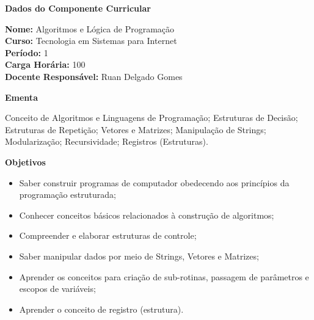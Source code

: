 
\begin{snugshade}\begin{center}\textbf{
    Dados do Componente Curricular
}\end{center}\end{snugshade}

\noindent \textbf{Nome:}                Algoritmos e L\'ogica de Programa\c{c}\~ao
\\        \textbf{Curso:}               Tecnologia em Sistemas para Internet
\\        \textbf{Período:}             \unit{1}{\degree}
\\        \textbf{Carga Horária:}       \unit{100}{\hour}
\\        \textbf{Docente Responsável:} Ruan Delgado Gomes


\begin{snugshade}\begin{center}\textbf{
    Ementa
\vphantom{q}}\end{center}\end{snugshade}

\noindent
Conceito de Algoritmos e Linguagens de Programação; Estruturas de Decisão; Estruturas de Repetição; Vetores e Matrizes; Manipulação de Strings; Modularização; Recursividade; Registros (Estruturas).

\begin{snugshade}\begin{center}\textbf{
    Objetivos
}\end{center}\end{snugshade}

\begin{itemize}

\item Saber construir programas de computador obedecendo aos princípios da programação estruturada;
\item Conhecer conceitos básicos relacionados à construção de algoritmos;
\item Compreender e elaborar estruturas de controle;
\item Saber manipular dados por meio de Strings, Vetores e Matrizes;
\item Aprender os conceitos para criação de sub-rotinas, passagem de parâmetros e escopos de variáveis;
\item Aprender o conceito de registro (estrutura).

\end{itemize} 

